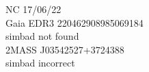 NC 17/06/22 \\

Gaia EDR3 220462908985069184\\
simbad not found \\
2MASS J03542527+3724388\\
simbad incorrect\\